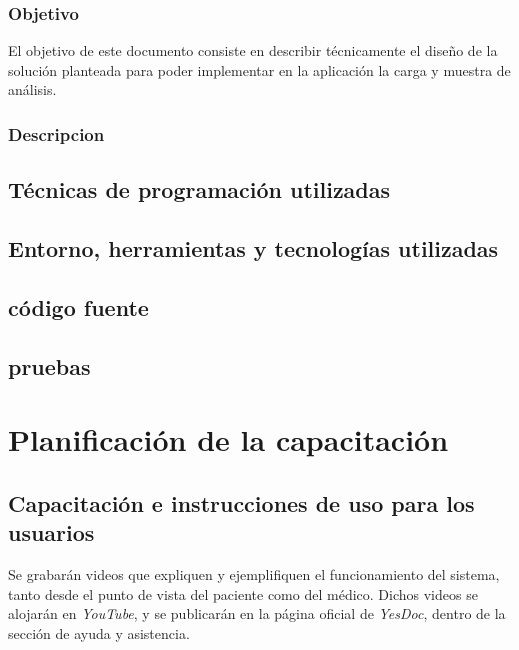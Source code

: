 \documentclass[a4paper,12pt]{article}
\begin{document}
\subsubsection{Objetivo}
El objetivo de este documento consiste en describir técnicamente el diseño de la solución planteada para poder implementar en la aplicación la carga y muestra de análisis.

\subsubsection{Descripcion}%



\subsection{Técnicas de programación utilizadas}
\subsection{Entorno, herramientas y tecnologías utilizadas}
\subsection{código fuente}
\subsection{pruebas}













\section{Planificación de la capacitación}

\subsection{Capacitación e instrucciones de uso para los usuarios}

Se grabarán videos que expliquen y ejemplifiquen el funcionamiento del sistema, tanto desde el punto de vista del paciente como del médico.
Dichos videos se alojarán en \textit{YouTube}, y se publicarán en la página oficial de \textit{YesDoc}, dentro de la sección de ayuda y asistencia.
\end{document}
